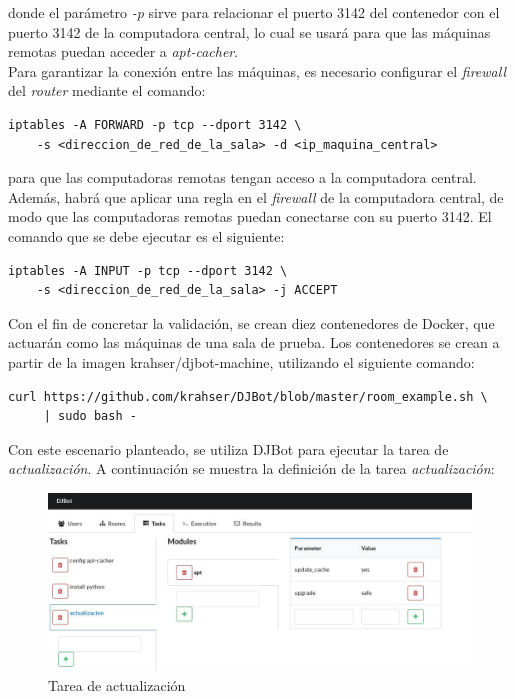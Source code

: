 \documentclass[a4paper,12pt]{article}
\begin{document}
donde el parámetro \emph{-p} sirve para relacionar el puerto 3142 del contenedor con el puerto 3142 de la computadora central, lo cual se usará para que las máquinas remotas puedan acceder a \emph{apt-cacher}.\\

Para garantizar la conexión entre las máquinas, es necesario configurar el \emph{firewall} del \emph{router} mediante el comando:\\

\begin{verbatim}
iptables -A FORWARD -p tcp --dport 3142 \
    -s <direccion_de_red_de_la_sala> -d <ip_maquina_central>
\end{verbatim}
para que las computadoras remotas tengan acceso a la computadora central.\\

Además, habrá que aplicar una regla en el \emph{firewall} de la computadora central, de modo que las computadoras remotas puedan conectarse con su puerto 3142. El comando que se debe ejecutar es el siguiente:\\

\begin{verbatim}
iptables -A INPUT -p tcp --dport 3142 \
    -s <direccion_de_red_de_la_sala> -j ACCEPT
\end{verbatim}

Con el fin de concretar la validación, se crean diez contenedores de Docker, que actuarán como las máquinas de una sala de prueba. Los contenedores se crean a partir de la imagen krahser/djbot-machine, utilizando el siguiente comando:\\

\begin{verbatim}
curl https://github.com/krahser/DJBot/blob/master/room_example.sh \
     | sudo bash -
\end{verbatim}

Con este escenario planteado, se utiliza DJBot para ejecutar la tarea de \emph{actualización}. A continuación se muestra la definición de la tarea
\emph{actualización}:

\newpage
\begin{figure}[htb]
\centering
\includegraphics[width=\textwidth]{./img/apt-update.jpg}
\caption{Tarea de actualización}
\end{figure}\\
\end{document}
